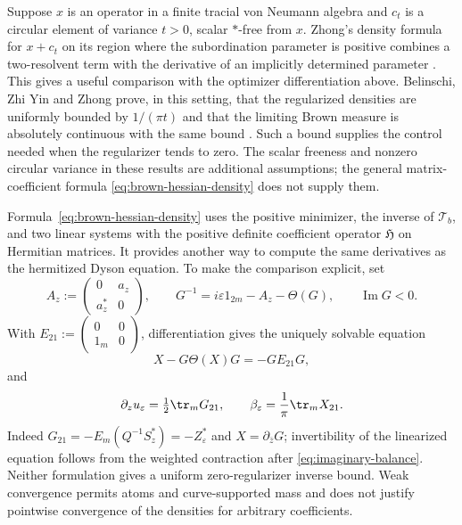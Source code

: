 \begin{remark}
\label{rem:brown-circular-addition}
Suppose $x$ is an operator in a finite tracial von Neumann algebra and $c_t$ is a circular element of variance $t>0$, scalar $*$-free from $x$.
Zhong's density formula for $x+c_t$ on its region where the subordination parameter is positive combines a two-resolvent term with the derivative of an implicitly determined parameter \cite[arXiv version, Theorem~4.2]{Zho26}.
This gives a useful comparison with the optimizer differentiation above.
Belinschi, Zhi Yin and Zhong prove, in this setting, that the regularized densities are uniformly bounded by $1/(\pi t)$ and that the limiting Brown measure is absolutely continuous with the same bound \cite[arXiv version, Theorem~7.10 and Lemma~7.11]{BYZ24}.
Such a bound supplies the control needed when the regularizer tends to zero.
The scalar freeness and nonzero circular variance in these results are additional assumptions; the general matrix-coefficient formula \eqref{eq:brown-hessian-density} does not supply them.
\end{remark}

Formula~\eqref{eq:brown-hessian-density} uses the positive minimizer, the inverse of $\mathcal T_b$, and two linear systems with the positive definite coefficient operator $\mathfrak H$ on Hermitian matrices.
It provides another way to compute the same derivatives as the hermitized Dyson equation.
To make the comparison explicit, set
\[
 A_z:=\begin{pmatrix}0&a_z\\a_z^*&0\end{pmatrix},\qquad
 G^{-1}=i\varepsilon1_{2m}-A_z-\Theta(G),\qquad
 \operatorname{Im}G<0.
\]
With $E_{21}:=\left(\begin{smallmatrix}0&0\\1_m&0\end{smallmatrix}\right)$, differentiation gives the uniquely solvable equation
\begin{equation}\label{eq:linearized-dyson}
 X-G\Theta(X)G=-GE_{21}G,
\end{equation}
and
\begin{equation}\label{eq:potential-derivatives}
 \partial_z u_\varepsilon=\tfrac12\tr_mG_{21},\qquad
 \beta_\varepsilon=\frac1\pi\tr_mX_{21}.
\end{equation}
Indeed $G_{21}=-E_m(Q^{-1}S_z^*)=-Z_\varepsilon^*$ and $X=\partial_{\bar z}G$; invertibility of the linearized equation follows from the weighted contraction after \eqref{eq:imaginary-balance}.
Neither formulation gives a uniform zero-regularizer inverse bound.
Weak convergence permits atoms and curve-supported mass and does not justify pointwise convergence of the densities for arbitrary coefficients.

